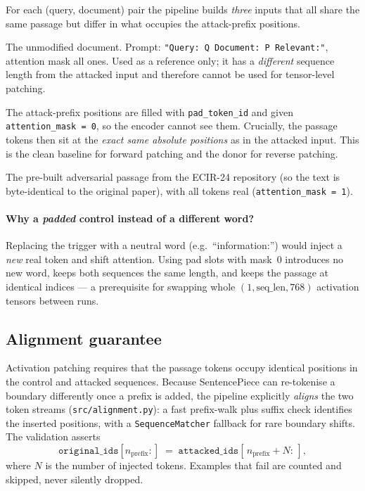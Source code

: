 \documentclass[11pt]{article}
\begin{document}
For each (query, document) pair the pipeline builds \emph{three} inputs that all
share the same passage but differ in what occupies the attack-prefix positions.

\begin{description}[leftmargin=2.2em,style=nextline]
  \item[Type A — Original (clean).] The unmodified document.
  Prompt: \texttt{"Query: Q Document: P Relevant:"}, attention mask all ones.
  Used as a reference only; it has a \emph{different} sequence length from the
  attacked input and therefore cannot be used for tensor-level patching.

  \item[Type B — Padded control.] The attack-prefix positions are filled with
  \texttt{pad\_token\_id} and given \texttt{attention\_mask = 0}, so the encoder
  cannot see them. Crucially, the passage tokens then sit at the
  \emph{exact same absolute positions} as in the attacked input. This is the
  clean baseline for forward patching and the donor for reverse patching.

  \item[Type C — Attacked.] The pre-built adversarial passage from the ECIR-24
  repository (so the text is byte-identical to the original paper), with all
  tokens real (\texttt{attention\_mask = 1}).
\end{description}

\paragraph{Why a \emph{padded} control instead of a different word?}
Replacing the trigger with a neutral word (e.g.\ ``information:'') would inject a
\emph{new} real token and shift attention. Using pad slots with mask~0 introduces
no new word, keeps both sequences the same length, and keeps the passage at
identical indices — a prerequisite for swapping whole
$(1,\text{seq\_len},768)$ activation tensors between runs.

\subsection{Alignment guarantee}

Activation patching requires that the passage tokens occupy identical positions
in the control and attacked sequences. Because SentencePiece can re-tokenise a
boundary differently once a prefix is added, the pipeline explicitly
\emph{aligns} the two token streams (\texttt{src/alignment.py}):
a fast prefix-walk plus suffix check identifies the inserted positions, with a
\texttt{SequenceMatcher} fallback for rare boundary shifts. The validation
asserts
\[
\texttt{original\_ids}[n_{\text{prefix}}:] \;=\;
\texttt{attacked\_ids}[\,n_{\text{prefix}}+N:\,],
\]
where $N$ is the number of injected tokens. Examples that fail are counted and
skipped, never silently dropped.
\end{document}
